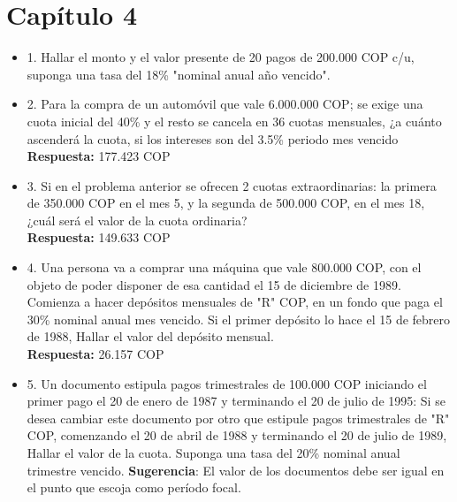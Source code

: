 \chapter*{Capítulo 4}


\begin{itemize}

 \item 1. Hallar el monto y el valor presente de 20 pagos de 200.000 COP c/u, suponga una tasa del 18\% "nominal anual año vencido".\\
       \medskip

 \item 2. Para la compra de un automóvil que vale 6.000.000 COP; se exige una cuota inicial del 40\% y el resto se cancela en 36 cuotas mensuales, ¿a cuánto ascenderá la cuota, si los intereses son del 3.5\% periodo mes vencido\\
       \textbf{Respuesta:} 177.423 COP\\
       \medskip

 \item 3. Si en el problema anterior se ofrecen 2 cuotas extraordinarias: la primera de
       350.000 COP en el mes 5, y la segunda de 500.000 COP, en el mes 18, ¿cuál será el valor de la cuota ordinaria?\\
       \textbf{Respuesta:} 149.633 COP\\
       \medskip

 \item 4. Una persona va a comprar una máquina que vale 800.000 COP, con el objeto de poder disponer de esa cantidad el 15 de diciembre de 1989. Comienza a hacer depósitos mensuales de "R" COP, en un fondo que paga el 30\% nominal anual mes vencido. Si el primer depósito lo hace el 15 de febrero de 1988, Hallar el valor del depósito mensual.\\
       \textbf{Respuesta:} 26.157 COP\\
       \medskip

 \item 5. Un documento estipula pagos trimestrales de 100.000 COP iniciando el primer pago el 20 de enero de 1987 y terminando el 20 de julio de 1995: Si se desea cambiar este documento por otro que estipule pagos trimestrales de "R" COP, comenzando el 20 de abril de 1988 y terminando el 20 de julio de 1989, Hallar el valor de la cuota. Suponga una tasa del 20\% nominal anual trimestre vencido. \textbf{Sugerencia}: El valor de los documentos debe ser igual en el punto que escoja como período focal.\\
       \medskip


\end{itemize}
